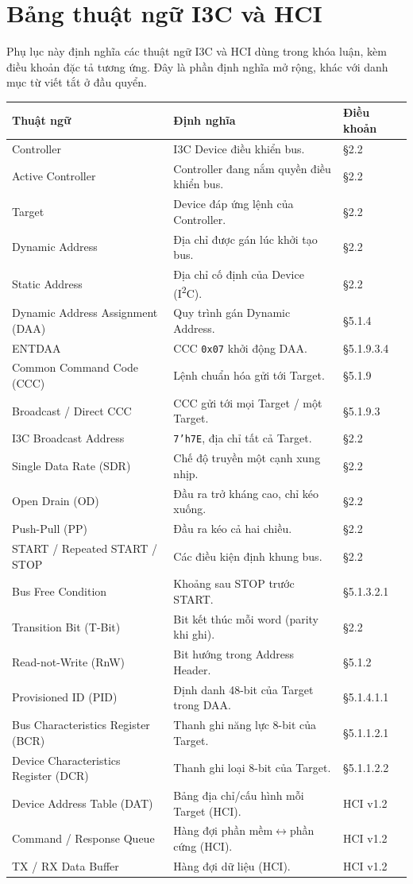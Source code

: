 \chapter{Bảng thuật ngữ I3C và HCI}
\label{app:glossary}

Phụ lục này định nghĩa các thuật ngữ I3C và HCI dùng trong khóa luận, kèm điều khoản đặc tả tương ứng. Đây
là phần định nghĩa mở rộng, khác với danh mục từ viết tắt ở đầu quyển.

\begin{longtable}{L{3.6cm} L{6.8cm} L{2.4cm}}
  \toprule
  \textbf{Thuật ngữ} & \textbf{Định nghĩa} & \textbf{Điều khoản} \\
  \midrule\endhead
  Controller & I3C Device điều khiển bus. & §2.2 \\
  Active Controller & Controller đang nắm quyền điều khiển bus. & §2.2 \\
  Target & Device đáp ứng lệnh của Controller. & §2.2 \\
  Dynamic Address & Địa chỉ được gán lúc khởi tạo bus. & §2.2 \\
  Static Address & Địa chỉ cố định của Device (I\textsuperscript{2}C). & §2.2 \\
  Dynamic Address Assignment (DAA) & Quy trình gán Dynamic Address. & §5.1.4 \\
  ENTDAA & CCC \texttt{0x07} khởi động DAA. & §5.1.9.3.4 \\
  Common Command Code (CCC) & Lệnh chuẩn hóa gửi tới Target. & §5.1.9 \\
  Broadcast / Direct CCC & CCC gửi tới mọi Target / một Target. & §5.1.9.3 \\
  I3C Broadcast Address & \texttt{7'h7E}, địa chỉ tất cả Target. & §2.2 \\
  Single Data Rate (SDR) & Chế độ truyền một cạnh xung nhịp. & §2.2 \\
  Open Drain (OD) & Đầu ra trở kháng cao, chỉ kéo xuống. & §2.2 \\
  Push-Pull (PP) & Đầu ra kéo cả hai chiều. & §2.2 \\
  START / Repeated START / STOP & Các điều kiện định khung bus. & §2.2 \\
  Bus Free Condition & Khoảng sau STOP trước START. & §5.1.3.2.1 \\
  Transition Bit (T-Bit) & Bit kết thúc mỗi word (parity khi ghi). & §2.2 \\
  Read-not-Write (RnW) & Bit hướng trong Address Header. & §5.1.2 \\
  Provisioned ID (PID) & Định danh 48-bit của Target trong DAA. & §5.1.4.1.1 \\
  Bus Characteristics Register (BCR) & Thanh ghi năng lực 8-bit của Target. & §5.1.1.2.1 \\
  Device Characteristics Register (DCR) & Thanh ghi loại 8-bit của Target. & §5.1.1.2.2 \\
  Device Address Table (DAT) & Bảng địa chỉ/cấu hình mỗi Target (HCI). & HCI v1.2 \\
  Command / Response Queue & Hàng đợi phần mềm$\leftrightarrow$phần cứng (HCI). & HCI v1.2 \\
  TX / RX Data Buffer & Hàng đợi dữ liệu (HCI). & HCI v1.2 \\
  \bottomrule
\end{longtable}
